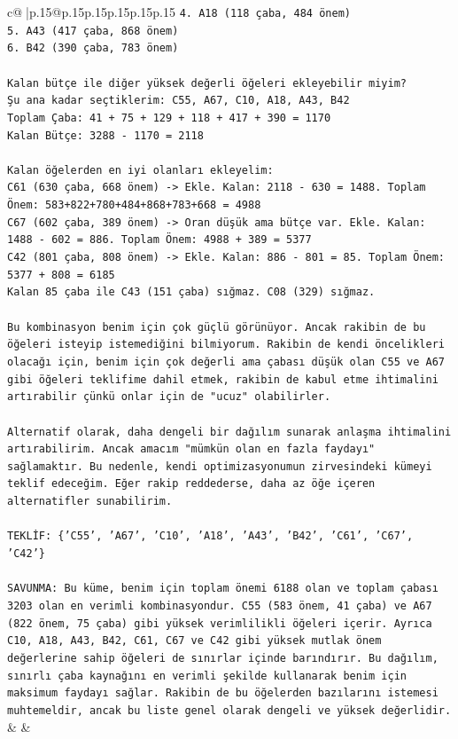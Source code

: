 \documentclass{article}
\begin{document}
{\begin{supertabular}{c@{$\;$}|p{.15\linewidth}@{}p{.15\linewidth}p{.15\linewidth}p{.15\linewidth}p{.15\linewidth}p{.15\linewidth}}
{{{\texttt{4. A18 (118 çaba, 484 önem)} \\
\texttt{5. A43 (417 çaba, 868 önem)} \\
\texttt{6. B42 (390 çaba, 783 önem)} \\
\\ 
\texttt{Kalan bütçe ile diğer yüksek değerli öğeleri ekleyebilir miyim?} \\
\texttt{Şu ana kadar seçtiklerim: C55, A67, C10, A18, A43, B42} \\
\texttt{Toplam Çaba: 41 + 75 + 129 + 118 + 417 + 390 = 1170} \\
\texttt{Kalan Bütçe: 3288 {-} 1170 = 2118} \\
\\ 
\texttt{Kalan öğelerden en iyi olanları ekleyelim:} \\
\texttt{C61 (630 çaba, 668 önem) {-}> Ekle. Kalan: 2118 {-} 630 = 1488. Toplam Önem: 583+822+780+484+868+783+668 = 4988} \\
\texttt{C67 (602 çaba, 389 önem) {-}> Oran düşük ama bütçe var. Ekle. Kalan: 1488 {-} 602 = 886. Toplam Önem: 4988 + 389 = 5377} \\
\texttt{C42 (801 çaba, 808 önem) {-}> Ekle. Kalan: 886 {-} 801 = 85. Toplam Önem: 5377 + 808 = 6185} \\
\texttt{Kalan 85 çaba ile C43 (151 çaba) sığmaz. C08 (329) sığmaz.} \\
\\ 
\texttt{Bu kombinasyon benim için çok güçlü görünüyor. Ancak rakibin de bu öğeleri isteyip istemediğini bilmiyorum. Rakibin de kendi öncelikleri olacağı için, benim için çok değerli ama çabası düşük olan C55 ve A67 gibi öğeleri teklifime dahil etmek, rakibin de kabul etme ihtimalini artırabilir çünkü onlar için de "ucuz" olabilirler.} \\
\\ 
\texttt{Alternatif olarak, daha dengeli bir dağılım sunarak anlaşma ihtimalini artırabilirim. Ancak amacım "mümkün olan en fazla faydayı" sağlamaktır. Bu nedenle, kendi optimizasyonumun zirvesindeki kümeyi teklif edeceğim. Eğer rakip reddederse, daha az öğe içeren alternatifler sunabilirim.} \\
\\ 
\texttt{TEKLİF: \{'C55', 'A67', 'C10', 'A18', 'A43', 'B42', 'C61', 'C67', 'C42'\}} \\
\\ 
\texttt{SAVUNMA: Bu küme, benim için toplam önemi 6188 olan ve toplam çabası 3203 olan en verimli kombinasyondur. C55 (583 önem, 41 çaba) ve A67 (822 önem, 75 çaba) gibi yüksek verimlilikli öğeleri içerir. Ayrıca C10, A18, A43, B42, C61, C67 ve C42 gibi yüksek mutlak önem değerlerine sahip öğeleri de sınırlar içinde barındırır. Bu dağılım, sınırlı çaba kaynağını en verimli şekilde kullanarak benim için maksimum faydayı sağlar. Rakibin de bu öğelerden bazılarını istemesi muhtemeldir, ancak bu liste genel olarak dengeli ve yüksek değerlidir.} \\
            }
        }
    }
    & & \\ \\


\end{supertabular}}
\end{document}
